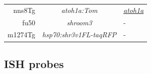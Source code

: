 \documentclass[11pt,singlespacinge,twoside]{reedthesis} %
\begin{document}
\begin{longtable}[]{@{}rcl@{}}
\begin{minipage}[t]{0.12\columnwidth}
nns8Tg\strut
\end{minipage} & \begin{minipage}[t]{0.29\columnwidth}\centering
\emph{atoh1a:Tom}\strut
\end{minipage} & \begin{minipage}[t]{0.50\columnwidth}\raggedright
\href{//zfin.org/ZDB-FISH-150901-21622}{\emph{atoh1a}}\strut
\end{minipage}\tabularnewline
\begin{minipage}[t]{0.12\columnwidth}\raggedleft
fu50\strut
\end{minipage} & \begin{minipage}[t]{0.29\columnwidth}\centering
\emph{shroom3}\strut
\end{minipage} & \begin{minipage}[t]{0.50\columnwidth}\raggedright
-\strut
\end{minipage}\tabularnewline
\begin{minipage}[t]{0.12\columnwidth}\raggedleft
m1274Tg\strut
\end{minipage} & \begin{minipage}[t]{0.29\columnwidth}\centering
\emph{hsp70:shr3v1FL-taqRFP}\strut
\end{minipage} & \begin{minipage}[t]{0.50\columnwidth}\raggedright
-\strut
\end{minipage}\tabularnewline
\bottomrule
\end{longtable}
\hypertarget{mat-probes}{%
\subsection{ISH probes}\label{mat-probes}}
\end{document}
